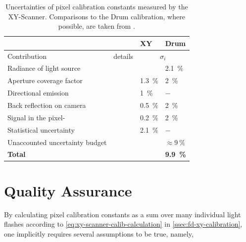 \begingroup
\renewcommand{\arraystretch}{1.3}
\begin{table}
	\begin{center}
	\caption{Uncertainties of pixel calibration constants measured by the 
	XY-Scanner. Comparisons to the Drum calibration, where possible, are 
	taken from \cite{brackAugerFluorescenceDetector2013, 
	crissUpdateRecentAbsolute2010, dorofeevFDAbsoluteCalibration}.}
	\begin{tabular*}{\textwidth}{w{l}{0.35\textwidth}w{r}{0.35\textwidth}|w{c}{0.1\textwidth}w{c}{0.1\textwidth}}
  	\toprule
	 & & XY & Drum \\
	\hline
	Contribution & details &  \\
	\hline
	Radiance of light source & & & \SI{2.1}{\percent} \\
	Aperture coverage factor & 
	\cite[][p.~127]{schaferXYScannerVersatileMethod2023} &
	\SI{1.3}{\percent} & \SI{2}{\percent} \\
	Directional emission & 
	\cite[][p.~83]{schaferXYScannerVersatileMethod2023} & 
	\SI{1}{\percent} & $-$ \\
	Back reflection on camera & 
	\cite[][p.~47]{schaferXYScannerVersatileMethod2023} & 
	\SI{0.5}{\percent} & \SI{2}{\percent} \\
	Signal in the pixel-\PMTs &
	\cite[][p.~114]{schaferXYScannerVersatileMethod2023} & 
	\SI{0.2}{\percent} & \SI{2}{\percent} \\
	\hline
	Statistical uncertainty & 
	\cite[][p.~116]{schaferXYScannerVersatileMethod2023} & 
	\SI{2.1}{\percent} & $-$ \\
	\hline
	Unaccounted uncertainty budget & & & $\approx\SI{9}{\percent}$ \\
	\hline
	\textbf{Total} & & & \textbf{\SI{9.9}{\percent}} \\ 
  \bottomrule
	\end{tabular*}
	\label{tab:xy-systematics}
	\end{center}
\end{table}
\endgroup


\section{Quality Assurance}
\label{sec:quality-assurance}

By calculating \FD pixel calibration constants as a sum over many individual 
light flashes according to \cref{eq:xy-scanner-calib-calculation} in 
\cref{ssec:fd-xy-calibration}, one implicitly requires several assumptions to be
true, namely,


